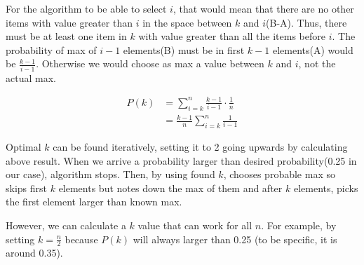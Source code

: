   For the algorithm to be able to select $i$, that would mean that there are no other items with value greater than $i$ in the space between $k$ and $i$(B-A). Thus, there must be at least one item in $k$ with value greater than all the items before $i$. The probability of max of $i − 1$ elements(B) must be in first $k − 1$ elements(A) would be $\frac{k-1}{i-1}$. Otherwise we would choose as max a value between $k$ and $i$, not the actual max.

\begin{align*}
   P(k) &= \sum_{i=k}^{n} \frac{k-1}{i-1} \cdot \frac{1}{n} \\
        &= \frac{k-1}{n} \sum_{i=k}^{n} \frac{1}{i-1} 
\end{align*}
         
  Optimal $k$ can be found iteratively, setting it to 2 going upwards by calculating above result. When we arrive a probability larger than desired probability(0.25 in our case), algorithm stops. Then, by using found $k$, chooses probable max so skips first $k$ elements but notes down the max of them and after $k$ elements, picks the first element larger than known max.
  
  However, we can calculate a $k$ value that can work for all $n$. For example, by setting $k = \frac{n}{2}$ because $P(k)$ will always larger than 0.25 (to be specific, it is around 0.35).